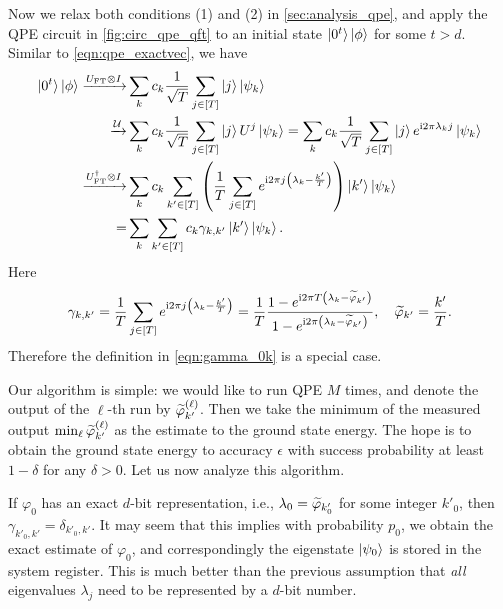 Now we relax both conditions (1) and (2) in \cref{sec:analysis_qpe}, and apply the QPE circuit in \cref{fig:circ_qpe_qft} to an initial state $\ket{0^t}\ket{\phi}$ for some $t>d$.
Similar to \cref{eqn:qpe_exactvec}, we have
\begin{equation}
\begin{split}
\ket{0^t}\ket{\phi} \xrightarrow{U_{\mathrm{FT}}\otimes I} & \sum_{k}c_k\frac{1}{\sqrt{T}}\sum_{j\in[T]}\ket{j}\ket{\psi_k}\\
\xrightarrow{\mathcal{U}} & \sum_{k} c_k \frac{1}{\sqrt{T}}\sum_{j\in[T]}\ket{j}U^j\ket{\psi_k}= \sum_{k} c_k \frac{1}{\sqrt{T}}\sum_{j\in[T]}\ket{j}e^{\mathrm{i} 2\pi \lambda_k j}\ket{\psi_k}\\
\xrightarrow{U_{\mathrm{FT}}^{\dag}\otimes I} &  
\sum_{k} c_k \sum_{k'\in[T]}\left(\frac{1}{T}\sum_{j\in[T]}
e^{\mathrm{i} 2\pi j\left(\lambda_k -\frac{k'}{T}\right)}\right)\ket{k'}\ket{\psi_k}\\
=& \sum_{k} \sum_{k'\in[T]} c_k \gamma_{k,k'}\ket{k'}\ket{\psi_k}.
\end{split}
\label{eqn:qpe_inexactvec}
\end{equation}
Here 
\begin{equation}
\gamma_{k,k'}=\frac{1}{T}\sum_{j\in[T]}
e^{\mathrm{i} 2\pi j\left(\lambda_k -\frac{k'}{T}\right)}=\frac{1}{T}\frac{1-e^{\mathrm{i} 2\pi T\left(\lambda_k - \widetilde{\varphi}_{k'}\right)}}{1-e^{\mathrm{i} 2\pi \left(\lambda_k - \widetilde{\varphi}_{k'}\right)}}, \quad \widetilde{\varphi}_{k'}=\frac{k'}{T}.
\end{equation}
Therefore the definition in \cref{eqn:gamma_0k} is a special case.



Our algorithm is simple: we would like to run QPE $M$ times, and denote the output of the $\ell$-th run by $\widetilde{\varphi}^{(\ell)}_{k'}$. 
Then we take the minimum of the measured output $\min_{\ell}\widetilde{\varphi}^{(\ell)}_{k'}$ as the estimate to the ground state energy.
The hope is to obtain the ground state energy to accuracy $\epsilon$ with success probability at least $1-\delta$ for any $\delta>0$. 
Let us now analyze this algorithm. 


If $\varphi_0$ has an exact $d$-bit representation, i.e., $\lambda_0=\widetilde{\varphi}_{k'_0}$ for some integer $k'_0$, then $\gamma_{k'_0,k'}=\delta_{k'_0,k'}$. 
It may seem that this implies with probability $p_0$, we obtain the exact estimate of $\varphi_0$, and correspondingly the eigenstate $\ket{\psi_0}$ is stored in the system register. This is much better than the previous assumption that \emph{all} eigenvalues $\lambda_j$ need to be represented by a $d$-bit number.

